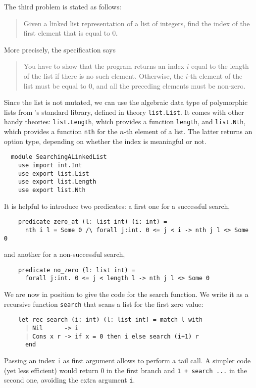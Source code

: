 The third problem is stated as follows:
\begin{quote}
  Given a linked list representation of a list of integers,
  find the index of the first element that is equal to 0.
\end{quote}
More precisely, the specification says
\begin{quote}
  You have to show that the program returns an index $i$ equal to the
  length of the list if there is no such element. Otherwise, the $i$-th
  element of the list must be equal to 0, and all the preceding
  elements must be non-zero.
\end{quote}
Since the list is not mutated, we can use the algebraic data type of
polymorphic lists from \why's standard library, defined in theory
\texttt{list.List}. It comes with other handy theories:
\texttt{list.Length}, which provides a function \texttt{length}, and
\texttt{list.Nth}, which provides a function \texttt{nth}
for the $n$-th element of a list. The latter returns an option type,
depending on whether the index is meaningful or not.
\begin{verbatim}
  module SearchingALinkedList
    use import int.Int
    use export list.List
    use export list.Length
    use export list.Nth
\end{verbatim}
It is helpful to introduce two predicates: a first one
for a successful search,
\begin{verbatim}
    predicate zero_at (l: list int) (i: int) =
      nth i l = Some 0 /\ forall j:int. 0 <= j < i -> nth j l <> Some 0
\end{verbatim}
and another for a non-successful search,
\begin{verbatim}
    predicate no_zero (l: list int) =
      forall j:int. 0 <= j < length l -> nth j l <> Some 0
\end{verbatim}
We are now in position to give the code for the search function.
We write it as a recursive function \texttt{search} that scans a list
for the first zero value:
\begin{verbatim}
    let rec search (i: int) (l: list int) = match l with
      | Nil      -> i
      | Cons x r -> if x = 0 then i else search (i+1) r
      end
\end{verbatim}
Passing an index \texttt{i} as first argument allows to perform a tail
call. A simpler code (yet less efficient) would return 0 in the first
branch and \texttt{1 + search ...} in the second one, avoiding the
extra argument \texttt{i}.

